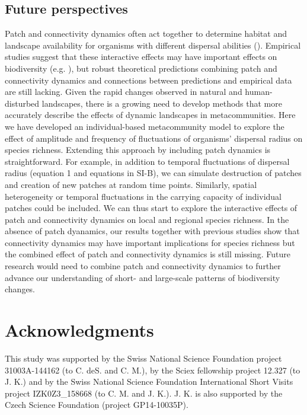 \documentclass[12pt]{article}
\begin{document}
\subsection*{Future perspectives}

Patch and connectivity dynamics often act together to determine habitat and landscape availability for organisms with different dispersal abilities (\cite{LauranceEtAl1997, Hanski1999, DebinskiHolt2000, KattwinkelEtAl2009, MetzgerEtAl2009}). Empirical studies suggest that these interactive effects may have important effects on biodiversity (e.g. \cite{LauranceEtAl1997, RoshierEtAl2008, MetzgerEtAl2009, RuizEtAl2014}), but robust theoretical predictions combining patch and connectivity dynamics and connections between predictions and empirical data are still lacking. Given the rapid changes observed in natural and human-disturbed landscapes, there is a growing need to develop methods that more accurately describe the effects of dynamic landscapes in metacommunities. Here we have developed an individual-based metacommunity model to explore the effect of amplitude and frequency of fluctuations of organisms' dispersal radius on species richness. Extending this approach by including patch dynamics is straightforward. For example, in addition to temporal fluctuations of dispersal radius (equation 1 and equations in SI-B), we can simulate destruction of patches and creation of new patches at random time points. Similarly, spatial heterogeneity or temporal fluctuations in the carrying capacity of individual patches could be included. We can thus start to explore the interactive effects of patch and connectivity dynamics on local and regional species richness. In the absence of patch dyanamics, our results together with previous studies show that connectivity dynamics may have important implications for species richness but the combined effect of patch and connectivity dynamics is still missing. Future research would need to combine patch and connectivity dynamics to further advance our understanding of short- and large-scale patterns of biodiversity changes. 

\section*{Acknowledgments}

This study was supported by the Swiss National Science Foundation project 31003A-144162 (to C. deS. and C. M.), by the Sciex fellowship project 12.327 (to J. K.) and by the Swiss National Science Foundation International Short Visits project IZK0Z3\_158668 (to C. M. and J. K.). J. K. is also supported by the Czech Science Foundation (project GP14-10035P).
\end{document}
